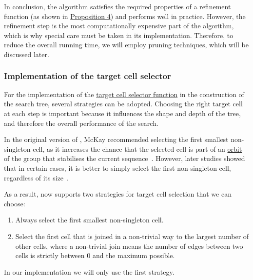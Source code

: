 In conclusion, the algorithm satisfies the required properties of a refinement function (as shown in \hyperref[prop:refinement_properties]{Proposition 4}) and performs well in practice. However, the refinement step is the most computationally expensive part of the algorithm, which is why special care must be taken in its implementation. Therefore, to reduce the overall running time, we will employ pruning techniques, which will be discussed later.


\subsubsection{Implementation of the target cell selector}

For the implementation of the \hyperref[def: target cell function]{target cell selector function} in the construction of the search tree, several strategies can be adopted. Choosing the right target cell at each step is important because it influences the shape and depth of the tree, and therefore the overall performance of the search.

In the original version of \Naut, McKay recommended selecting the first smallest non-singleton cell, as it increases the chance that the selected cell is part of an \hyperref[def:orbit]{orbit} of the group that stabilises the current sequence~\cite{mckay1981practical}. However, later studies showed that in certain cases, it is better to simply select the first non-singleton cell, regardless of its size~\cite{kirk1985efficiency}.

As a result, \Naut{} now supports two strategies for target cell selection that we can choose:

\begin{enumerate}
\item Always select the first smallest non-singleton cell.
\item Select the first cell that is joined in a non-trivial way to the largest number of other cells, where a non-trivial join means the number of edges between two cells is strictly between 0 and the maximum possible.
\end{enumerate}


In our implementation we will only use the first strategy. 

\vspace{0.5em}
\noindent{}


